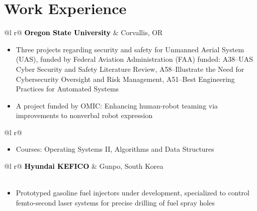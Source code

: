 \documentclass[letterpaper,9pt]{article}
\begin{document}
{\selectfont
\section{Work Experience}
}
\vspace{-2mm}
\begin{tabularx}{\linewidth}{ @{}l r@{} }
\textcolor{Black}{\textbf{Oregon State University}} & \hfill Corvallis, OR \\[1pt]
\end{tabularx}
\vspace{-1em}
\begin{itemize}[nosep,after=\strut, leftmargin=1em, itemsep=1pt, topsep=0pt]
    \item Three projects regarding security and safety for Unmanned Aerial System (UAS), funded by Federal Aviation Administration (FAA) funded: A38--UAS Cyber Security and Safety Literature Review, A58--Illustrate the Need for Cybersecurity Oversight and Risk Management, A51--Best Engineering Practices for Automated Systems
    \item A project funded by OMIC: Enhancing human-robot teaming via improvements to nonverbal robot expression
\end{itemize}
\vspace{-3pt}
\begin{tabularx}{\linewidth}{ @{}l r@{} }
\\[2pt]
\end{tabularx}
\vspace{-2em}
\begin{itemize}[nosep,after=\strut, leftmargin=1em, itemsep=2pt]
    \item Courses: Operating Systems II, Algorithms and Data Structures
\end{itemize}

\vspace{-1.5mm}

\begin{tabularx}{\linewidth}{ @{}l r@{} }
\textcolor{Black}{\textbf{Hyundai KEFICO}} & \hfill Gunpo, South Korea \\[2pt]
\\[1pt]
\end{tabularx}
\vspace{-1em}
\begin{itemize}[nosep,after=\strut, leftmargin=1em, itemsep=2pt]
    \item Prototyped gasoline fuel injectors under development, specialized to control femto-second laser systems for precise drilling of fuel spray holes
\end{itemize}
\end{document}
